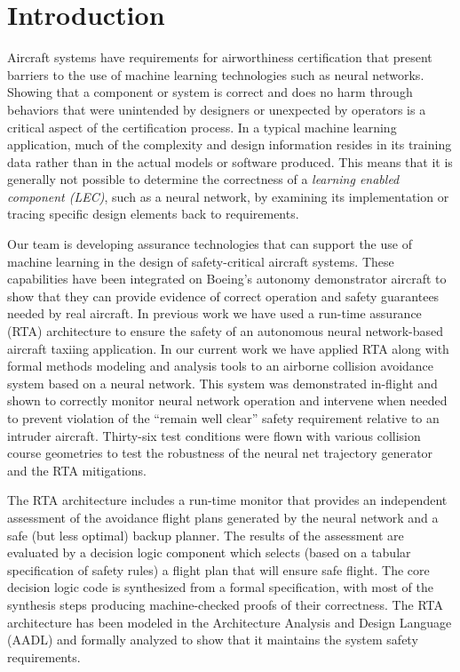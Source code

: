\section{Introduction}

Aircraft systems have requirements for airworthiness certification that present barriers to the use
of machine learning technologies such as neural networks. Showing that a component or system is
correct and does no harm through behaviors that were unintended by designers or unexpected by
operators is a critical aspect of the certification process. In a typical machine learning
application, much of the complexity and design information resides in its training data rather than
in the actual models or software produced. This means that it is generally not possible to determine
the correctness of a {\em learning enabled component (LEC)}, such as a neural network, 
by examining its implementation or tracing specific design
elements back to requirements.

Our team is developing assurance technologies that can support the use of machine learning in the
design of safety-critical aircraft systems. These capabilities have been integrated on Boeing’s
autonomy demonstrator aircraft to show that they can provide evidence of correct operation and
safety guarantees needed by real aircraft. In previous work \cite{dasc2020} we have used a run-time assurance
(RTA) architecture to ensure the safety of an autonomous neural network-based aircraft taxiing
application. In our current work we have applied RTA along with formal methods
modeling and analysis tools to an airborne collision avoidance system based on a neural network.
This system was demonstrated in-flight and shown to correctly monitor neural network operation and
intervene when needed to prevent violation of the “remain well clear” safety requirement relative to
an intruder aircraft. Thirty-six test conditions were flown with various collision course
geometries
to test the robustness of the neural net trajectory generator and
the RTA mitigations.

The RTA architecture includes a run-time monitor that provides an independent assessment of the
avoidance flight plans generated by the neural network and a safe (but less optimal) backup planner.
The results of the assessment are evaluated by a decision logic component which selects (based on a
tabular specification of safety rules) a flight plan that will ensure safe flight. The core decision
logic code is synthesized from a formal specification, with most of the synthesis steps producing
machine-checked proofs of their correctness. The RTA architecture has been modeled in the
Architecture Analysis and Design Language (AADL) and formally analyzed to show that it maintains the
system safety requirements.

